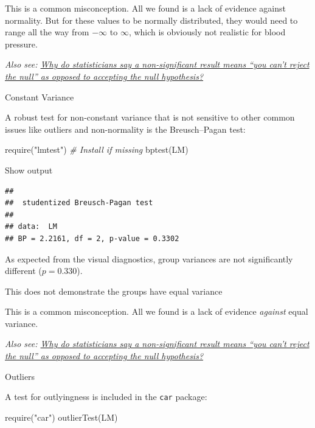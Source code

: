 \documentclass[
]{book}
\newenvironment{Shaded}{\begin{snugshade}}{\end{snugshade}}
\newcommand{\CommentTok}[1]{\textcolor[rgb]{0.56,0.35,0.01}{\textit{#1}}}
\newcommand{\FunctionTok}[1]{\textcolor[rgb]{0.00,0.00,0.00}{#1}}
\newcommand{\NormalTok}[1]{#1}
\newcommand{\StringTok}[1]{\textcolor[rgb]{0.31,0.60,0.02}{#1}}
\begin{document}
This is a common misconception. All we found is a lack of evidence against normality. But for these values to be normally distributed, they would need to range all the way from \(-\infty\) to \(\infty\), which is obviously not realistic for blood pressure.

\emph{Also see: \href{https://stats.stackexchange.com/a/85914/176202}{Why do statisticians say a non-significant result means ``you can't reject the null'' as opposed to accepting the null hypothesis?}}

Constant Variance

A robust test for non-constant variance that is not sensitive to other common issues like outliers and non-normality is the Breusch--Pagan test:

\begin{Shaded}
\begin{Highlighting}[]
\FunctionTok{require}\NormalTok{(}\StringTok{"lmtest"}\NormalTok{) }\CommentTok{\# Install if missing}
\FunctionTok{bptest}\NormalTok{(LM)}
\end{Highlighting}
\end{Shaded}

Show output

\begin{verbatim}
## 
##  studentized Breusch-Pagan test
## 
## data:  LM
## BP = 2.2161, df = 2, p-value = 0.3302
\end{verbatim}

As expected from the visual diagnostics, group variances are not significantly different (\(p = 0.330\)).

This does not demonstrate the groups have equal variance

This is a common misconception. All we found is a lack of evidence \emph{against} equal variance.

\emph{Also see: \href{https://stats.stackexchange.com/a/85914/176202}{Why do statisticians say a non-significant result means ``you can't reject the null'' as opposed to accepting the null hypothesis?}}

Outliers

A test for outlyingness is included in the \texttt{car} package:

\begin{Shaded}
\begin{Highlighting}[]
\FunctionTok{require}\NormalTok{(}\StringTok{"car"}\NormalTok{)}
\FunctionTok{outlierTest}\NormalTok{(LM)}
\end{Highlighting}
\end{Shaded}
\end{document}
